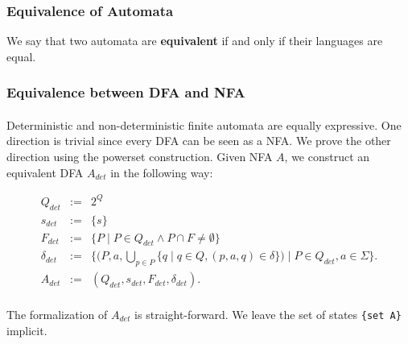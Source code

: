
\subsubsection{Equivalence of Automata}
\begin{definition}
    We say that two automata are \textbf{equivalent} if and only if their languages are equal.
\end{definition}

\subsubsection{Equivalence between DFA and NFA}
\paragraph{} 
Deterministic and non-deterministic finite automata are equally expressive. 
One direction is trivial since every DFA can be seen as a NFA. 
We prove the other direction using the powerset construction. 
Given NFA $A$, we construct an equivalent DFA $A_{det}$ in the following way:

\begin{eqnarray*}
    Q_{det} & := & 2^Q \\ %
    {s}_{det} & := & \{ s \} \\
    F_{det} & := & \{ P \; | \; P \in Q_{det} \wedge P \cap F \neq \emptyset \} \\
    \delta_{det} & := & \{ (P,a,\bigcup \limits _{p \in P} \{ q \; | \; q \in Q, (p,a,q) \in \delta \}) \; | \; P \in Q_{det}, a \in \Sigma \}.     \\
    A_{det} &:=&  (Q_{det}, s_{det}, F_{det}, \delta_{det}).
\end{eqnarray*}

\paragraph{}
The formalization of $A_{det}$ is straight-forward. 
We leave the set of states \lstinline!{set A}! implicit.

